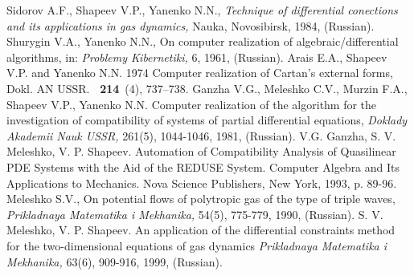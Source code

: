 \documentclass[11pt, draft]{article}
\begin{document}
\begin{thebibliography}{}
Sidorov A.F., Shapeev V.P., Yanenko N.N., {\it Technique
of differential conections and its applications in gas dynamics,}
Nauka, Novosibirsk, 1984, (Russian).
Shurygin V.A., Yanenko N.N., On computer realization of
algebraic/differential algorithms, in: {\it Problemy
Kibernetiki,} 6, 1961, (Russian).
  Arais E.A., Shapeev V.P. and Yanenko N.N. 1974 Computer realization
of Cartan's external forms, Dokl. AN USSR. {\bf~214}~(4),
737--738.
Ganzha V.G.,
 Meleshko C.V., Murzin F.A., Shapeev V.P., Yanenko N.N.
 Computer realization of the
algorithm for the investigation of compatibility of systems of
partial differential equations, {\it Doklady Akademii Nauk
USSR,} 261(5), 1044-1046, 1981, (Russian).
V.G. Ganzha, S. V. Meleshko, V. P. Shapeev. Automation of
Compatibility Analysis of Quasilinear PDE Systems with the Aid
of the REDUSE System. Computer Algebra and Its Applications
to Mechanics. Nova Science Publishers, New York, 1993, p. 89-96.
Meleshko S.V., On potential flows of polytropic gas of
the type of triple waves, {\it Prikladnaya Matematika i
Mekhanika,} 54(5), 775-779, 1990, (Russian).
S. V. Meleshko, V. P. Shapeev.
An application of the differential constraints method for
the two-dimensional equations of gas dynamics
{\it Prikladnaya Matematika i Mekhanika,}
 63(6), 909-916, 1999, (Russian).
\end{thebibliography}
\end{document}
